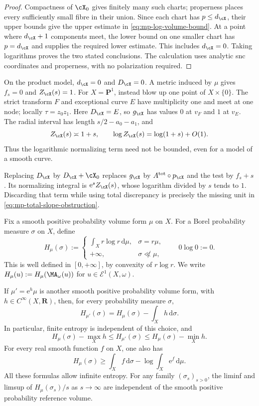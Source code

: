 \begin{proof}
Compactness of $\cX_0$ gives finitely many such charts; properness places every sufficiently small fibre in their union. Since each chart has $p\leq d_{\cX}$, their upper bounds give the upper estimate in \eqref{eq:mp-log-volume-bound}. At a point where $d_{\cX}+1$ components meet, the lower bound on one smaller chart has $p=d_{\cX}$ and supplies the required lower estimate. This includes $d_{\cX}=0$. Taking logarithms proves the two stated conclusions. The calculation uses analytic snc coordinates and properness, with no polarization required.
\end{proof}

\begin{example}\label{ex:mp-log-volume-node}
On the product model, $d_{\cX}=0$ and $D_{\cX}=0$. A metric induced by $\mu$ gives $f_s=0$ and $Z_{\cX}(s)=1$. For $X=\mathbf P^1$, instead blow up one point of $X\times\{0\}$. The strict transform $F$ and exceptional curve $E$ have multiplicity one and meet at one node; locally $\tau=z_0z_1$. Here $D_{\cX}=E$, so $g_{\cX}$ has values $0$ at $v_F$ and $1$ at $v_E$. The radial interval has length $s/2-a_0-a_1$, and
\[
                 Z_{\cX}(s)\asymp1+s,\qquad
                 \log Z_{\cX}(s)=\log(1+s)+O(1).
\]
Thus the logarithmic normalizing term need not be bounded, even for a model of a smooth curve.
\end{example}

Replacing $D_{\cX}$ by $D_{\cX}+\cX_0$ replaces $g_{\cX}$ by $A^{\mathrm{tot}}\circ p_{\cX}$ and the test by $f_s+s$. Its normalizing integral is $\mathrm{e}^sZ_{\cX}(s)$, whose logarithm divided by $s$ tends to $1$. Discarding that term while using total discrepancy is precisely the missing unit in \eqref{eq:mp-total-slope-obstruction}.

Fix a smooth positive probability volume form $\mu$ on $X$. For a Borel probability measure $\sigma$ on $X$, define
{
\[
 H_\mu(\sigma):=
 \begin{cases}
  \displaystyle\int_X r\log r\,\mathrm{d}\mu,&\sigma=r\mu,\\
  +\infty,&\sigma\not\ll\mu,
 \end{cases}
 \qquad 0\log0:=0.
\]}
This is well defined in $[0,+\infty]$, by convexity of $r\log r$. We write $H_\mu(u):=H_\mu(\MA_\omega(u))$ for $u\in\mathcal E^1(X,\omega)$.

\begin{lemma}\label{lem:mp-entropy-reference-change}
If $\mu'=\mathrm{e}^h\mu$ is another smooth positive probability volume form, with $h\in C^\infty(X,\mathbf R)$, then, for every probability measure $\sigma$,
\[
 H_{\mu'}(\sigma)=H_\mu(\sigma)-\int_Xh\,\mathrm{d}\sigma.
\]
In particular, finite entropy is independent of this choice, and
\[
 H_\mu(\sigma)-\max_Xh\leq H_{\mu'}(\sigma)
                     \leq H_\mu(\sigma)-\min_Xh.
\]
For every real smooth function $f$ on $X$, one also has
\[
 H_\mu(\sigma)\geq\int_Xf\,\mathrm{d}\sigma
                         -\log\int_X\mathrm{e}^f\,\mathrm{d}\mu.
\]
All these formulas allow infinite entropy. For any family $(\sigma_s)_{s>0}$, the liminf and limsup of $H_\mu(\sigma_s)/s$ as $s\to\infty$ are independent of the smooth positive probability reference volume.
\end{lemma}

